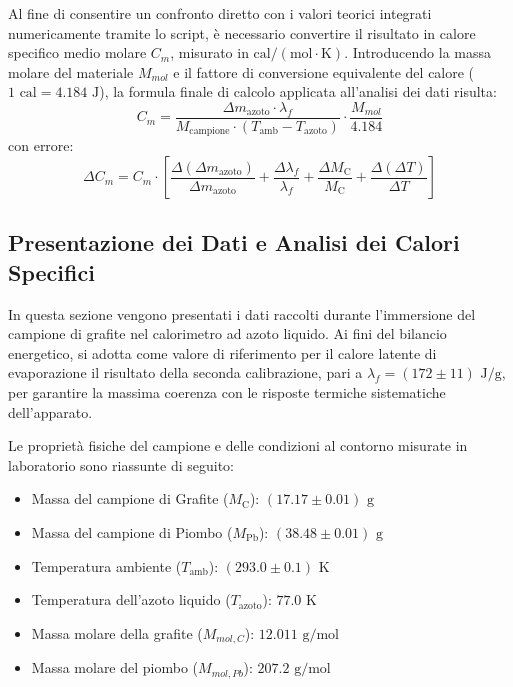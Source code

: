 \documentclass[a4paper,12pt]{article}
\begin{document}
Al fine di consentire un confronto diretto con i valori teorici integrati numericamente tramite lo script, è necessario convertire il risultato in calore specifico medio molare $C_m$, misurato in $\text{cal}/(\text{mol}\cdot\text{K})$. Introducendo la massa molare del materiale $M_{mol}$ e il fattore di conversione equivalente del calore ($1\text{ cal} = 4.184\text{ J}$), la formula finale di calcolo applicata all'analisi dei dati risulta:
\begin{equation*}
    C_m = \frac{\Delta m_{\text{azoto}} \cdot \lambda_f}{M_{\text{campione}} \cdot (T_{\text{amb}} - T_{\text{azoto}})} \cdot \frac{M_{mol}}{4.184}
\end{equation*}
con errore:
\begin{equation*}
    \Delta C_{m} = C_{m} \cdot \left[ \frac{\Delta(\Delta m_{\text{azoto}})}{\Delta m_{\text{azoto}}} + \frac{\Delta \lambda_f}{\lambda_f} + \frac{\Delta M_{\text{C}}}{M_{\text{C}}} + \frac{\Delta(\Delta T)}{\Delta T} \right]
\end{equation*}
\newpage
\subsection{Presentazione dei Dati e Analisi dei Calori Specifici}
In questa sezione vengono presentati i dati raccolti durante l'immersione del campione di grafite nel calorimetro ad azoto liquido. Ai fini del bilancio energetico, si adotta come valore di riferimento per il calore latente di evaporazione il risultato della seconda calibrazione, pari a $\lambda_f = (172 \pm 11)\text{ J/g}$, per garantire la massima coerenza con le risposte termiche sistematiche dell'apparato.

Le proprietà fisiche del campione e delle condizioni al contorno misurate in laboratorio sono riassunte di seguito:
\begin{itemize}
    \item Massa del campione di Grafite ($M_{\text{C}}$): $(17.17 \pm 0.01)\text{ g}$
    \item Massa del campione di Piombo ($M_{\text{Pb}}$): $(38.48 \pm 0.01)\text{ g}$
    \item Temperatura ambiente ($T_{\text{amb}}$): $(293.0 \pm 0.1)\text{ K}$
    \item Temperatura dell'azoto liquido ($T_{\text{azoto}}$): $77.0\text{ K}$
    \item Massa molare della grafite ($M_{mol,C}$): $12.011\text{ g/mol}$
    \item Massa molare del piombo ($M_{mol,Pb}$): $207.2\text{ g/mol}$
\end{itemize}
\end{document}
